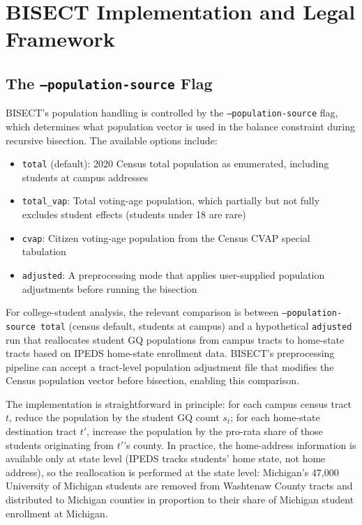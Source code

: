 \section{BISECT Implementation and Legal Framework}
\label{sec:bisect}

\subsection{The \texttt{--population-source} Flag}

BISECT's population handling is controlled by the \texttt{--population-source} flag, which determines what population vector is used in the balance constraint during recursive bisection. The available options include:

\begin{itemize}
    \item \texttt{total} (default): 2020 Census total population as enumerated, including students at campus addresses
    \item \texttt{total\_vap}: Total voting-age population, which partially but not fully excludes student effects (students under 18 are rare)
    \item \texttt{cvap}: Citizen voting-age population from the Census CVAP special tabulation
    \item \texttt{adjusted}: A preprocessing mode that applies user-supplied population adjustments before running the bisection
\end{itemize}

For college-student analysis, the relevant comparison is between \texttt{--population-source total} (census default, students at campus) and a hypothetical \texttt{adjusted} run that reallocates student GQ populations from campus tracts to home-state tracts based on IPEDS home-state enrollment data. BISECT's preprocessing pipeline can accept a tract-level population adjustment file that modifies the Census population vector before bisection, enabling this comparison.

The implementation is straightforward in principle: for each campus census tract $t$, reduce the population by the student GQ count $s_t$; for each home-state destination tract $t'$, increase the population by the pro-rata share of those students originating from $t'$'s county. In practice, the home-address information is available only at state level (IPEDS tracks students' home state, not home address), so the reallocation is performed at the state level: Michigan's 47,000 University of Michigan students are removed from Washtenaw County tracts and distributed to Michigan counties in proportion to their share of Michigan student enrollment at Michigan.

